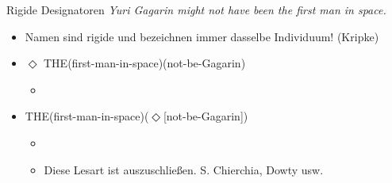 \begin{frame}
  {Rigide Designatoren}
  \onslide<+->
  \onslide<+->
  \textit{Yuri Gagarin \alert{might not} have been the first man in space.}\\
  \Halbzeile
  \begin{itemize}[<+->]
    \item Namen sind \alert{rigide} und bezeichnen immer dasselbe Individuum! (Kripke)
      \Halbzeile
    \item $\Diamond$ THE(first-man-in-space)(not-be-Gagarin)
      \begin{itemize}[<+->]
        \item {}
      \end{itemize}
      \Halbzeile
    \item THE(first-man-in-space)($\Diamond$[not-be-Gagarin])
      \begin{itemize}[<+->]
        \item {}
        \item Diese Lesart ist auszuschließen. S. Chierchia, Dowty usw.
      \end{itemize}
  \end{itemize}
\end{frame}

